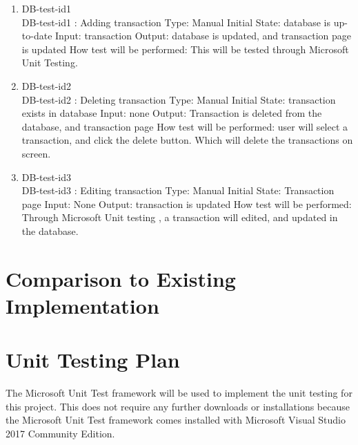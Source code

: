 \documentclass[12pt, titlepage]{article}
\begin{document}
\begin{enumerate}

\item{DB-test-id1\\}
DB-test-id1 : Adding transaction
\newline
Type: Manual
\newline
Initial State: database is up-to-date 
\newline
Input: transaction 
\newline
Output: database is updated, and transaction page is updated
\newline
How test will be performed:  This will be tested through Microsoft Unit Testing.


					
\item{DB-test-id2\\}
DB-test-id2 : Deleting transaction
\newline
Type: Manual
\newline
Initial State: transaction exists in database
\newline
Input: none
\newline
Output: Transaction is deleted from the database, and transaction page 
\newline
How test will be performed:  user will select a transaction, and click the delete button. Which will delete the transactions on screen.

\item{DB-test-id3\\}
DB-test-id3 : Editing transaction 
\newline
Type: Manual
\newline
Initial State: Transaction page
\newline
Input: None
\newline
Output: transaction is updated 
\newline
How test will be performed:  Through Microsoft Unit testing , a transaction will edited, and updated in the database.
\end{enumerate}


\section{Comparison to Existing Implementation}	
				
\section{Unit Testing Plan}
The Microsoft Unit Test framework will be used to implement the unit testing for this project. This does not require any further downloads or installations because the Microsoft Unit Test framework comes installed with Microsoft Visual Studio 2017 Community Edition. 
		
\end{document}
